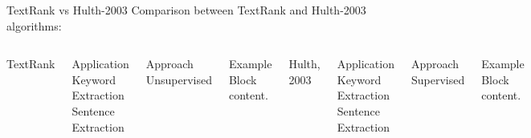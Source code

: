 \documentclass[10pt]{beamer}
\begin{document}
\begin{frame}{TextRank vs Hulth-2003}
  Comparison between TextRank and Hulth-2003 algorithms:

  \begin{columns}[T,onlytextwidth]
    
    \begin{center}
    	TextRank
    \end{center}
    

      \begin{block}{Application}
        Keyword Extraction\\
        Sentence Extraction
      \end{block}

      \begin{alertblock}{Approach}
        Unsupervised
      \end{alertblock}

      \begin{exampleblock}{Example}
        Block content.
      \end{exampleblock}


    \begin{center}
    	Hulth, 2003
    \end{center}

      \begin{block}{Application}
        Keyword Extraction\\
        Sentence Extraction
      \end{block}

      \begin{alertblock}{Approach}
        Supervised
      \end{alertblock}

      \begin{exampleblock}{Example}
        Block content.
      \end{exampleblock}

  \end{columns}
\end{frame}
\end{document}
